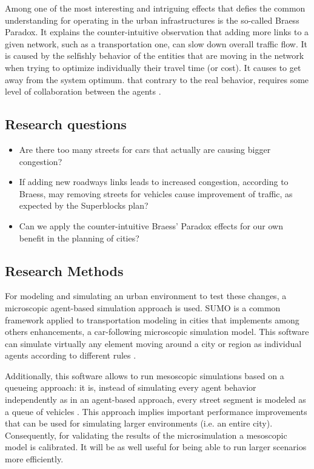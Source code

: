 \documentclass[11pt]{article}
\begin{document}
Among one of the most interesting and intriguing effects that defies the common understanding for operating in the urban infrastructures is the so-called Braess Paradox. It explains the counter-intuitive observation that adding more links to a given network, such as a transportation one, can slow down overall traffic flow. It is caused by the selfishly behavior of the entities that are moving in the network when trying to optimize individually their travel time (or cost). It causes to get away from the system optimum. that contrary to the real behavior, requires some level of collaboration between the agents \citep{Braess1969}.

\subsection {Research questions}

\begin{itemize}
    \item Are there too many streets for cars that actually are causing bigger congestion?
    \item If adding new roadways links leads to increased congestion, according to Braess, may removing streets for vehicles cause improvement of traffic, as expected by the Superblocks plan?
    \item Can we apply the counter-intuitive Braess’ Paradox effects for our own benefit in the planning of cities?
\end{itemize}

\subsection {Research Methods}

For modeling and simulating an urban environment to test these changes, a microscopic agent-based simulation approach is used. SUMO is a common framework applied to transportation modeling in cities that implements among others enhancements, a car-following microscopic simulation model. This software can simulate virtually any element moving around a city or region as individual agents according to different rules \citep{Lopez2018}.

Additionally, this software allows to run mesoscopic simulations based on a queueing approach: it is, instead of simulating every agent behavior independently as in an agent-based approach, every street segment is modeled as a queue of vehicles \citep{Eissfeldt2004}. This approach implies important performance improvements that can be used for simulating larger environments (i.e. an entire city). Consequently, for validating the results of the microsimulation a mesoscopic model is calibrated. It will be as well useful for being able to run larger scenarios more efficiently. 
\end{document}
